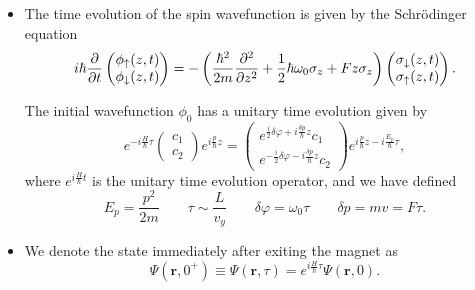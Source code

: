 \documentclass[11pt, a4paper]{article}
\newcommand{\Schro}{Schr\"{o}dinger\xspace}
\renewcommand{\vec}[1]{\bm{#1}}  %
\newcommand{\ua}{\uparrow}  %
\newcommand{\da}{\downarrow}  %
\renewcommand{\r}{\vec{r}}  %
\begin{document}
\begin{itemize}
    \item The time evolution of the spin wavefunction is given by the \Schro equation
    \begin{equation*}
        i \hbar \pdv{t} 
        \begin{pmatrix}
            \phi_{\ua}(z, t)\\
            \phi_{\da}(z, t)
        \end{pmatrix}
        = - 
        \left( \frac{\hbar^{2}}{2m}\pdv[2]{}{z} + \frac{1}{2}\hbar\omega_{0} \sigma_{z} + F z \sigma_{z} \right)
        \begin{pmatrix}
            \sigma_{\da}(z, t)\\
            \sigma_{\ua}(z, t)
        \end{pmatrix}.
    \end{equation*}

    The initial wavefunction $ \phi_{0} $ has a unitary time evolution given by
    \begin{equation*}
        e^{-i \frac{H}{\hbar}\tau}
        \begin{pmatrix}
            c_{1}\\
            c_{2}
        \end{pmatrix}
        e^{i \frac{p}{\hbar}z}
        = 
        \begin{pmatrix}
            e^{\frac{i}{2}\delta\varphi + i \frac{\delta p}{\hbar}z}c_{1}\\
            e^{-\frac{i}{2}\delta\varphi - i \frac{\delta p}{\hbar}z}c_{2}
        \end{pmatrix}
        e^{i \frac{p}{\hbar}z - i \frac{E_{p}}{\hbar}\tau},
    \end{equation*}
    where $ e^{i \frac{H}{\hbar}t} $ is the unitary time evolution operator, and we have defined
    \begin{equation*}
        E_{p} = \frac{p^{2}}{2m} \qquad \tau \sim \frac{L}{v_{y}} \qquad \delta \varphi = \omega_{0} \tau \qquad \delta p = m v = F \tau.
    \end{equation*}

    \item We denote the state immediately after exiting the magnet as
    \begin{equation*}
        \Psi(\r, 0^{+}) \equiv \Psi(\r, \tau) = e^{i \frac{H}{\hbar}\tau}\Psi(\r, 0).
    \end{equation*}


\end{itemize}
\end{document}
